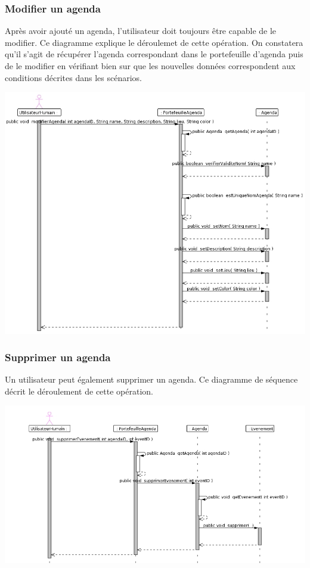 \documentclass[12pt , a4paper]{article}
\begin{document}
\begin{landscape}
\subsubsection{Modifier un agenda}
\noindent Après avoir  ajouté un agenda, l'utilisateur  doit toujours \^etre capable de  le modifier. Ce diagramme  explique le déroulemet de cette  opération. On constatera qu'il  s'agit de récupérer
l'agenda correspondant dans le portefeuille d'agenda puis de le modifier en vérifiant bien sur que les nouvelles données correspondent aux conditions décrites dans les scénarios.
\begin{center}
  \includegraphics[scale=0.55]{./images/diag_seq_modifier_agenda.jpg}
\end{center}
\end{landscape}

\begin{landscape}
\subsubsection{Supprimer un agenda}
\noindent Un utilisateur peut également supprimer un agenda. Ce diagramme de séquence décrit le déroulement de cette opération.
\begin{center}
  \includegraphics[scale=0.55]{./images/diag_seq_supprimer_agenda.jpg}
\end{center}
\end{landscape}
\end{document}
